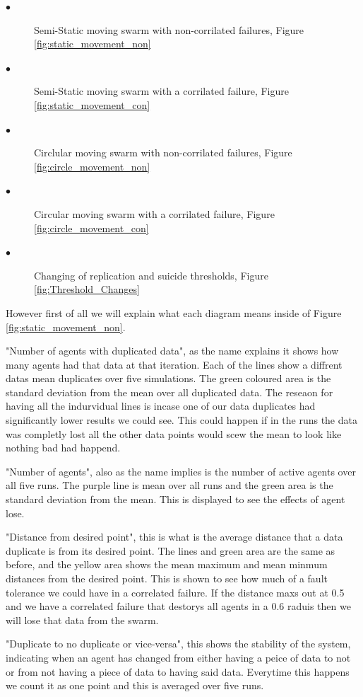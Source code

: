 \documentclass{UoYCSproject}
\begin{document}
\begin{description}
\item[$\bullet$] Semi-Static moving swarm with non-corrilated failures, Figure \ref{fig:static_movement_non}
\item[$\bullet$] Semi-Static moving swarm with a corrilated failure, Figure \ref{fig:static_movement_con}
\item[$\bullet$] Circlular moving swarm with non-corrilated failures, Figure \ref{fig:circle_movement_non}
\item[$\bullet$] Circular moving swarm with a corrilated failure, Figure \ref{fig:circle_movement_con}
\item[$\bullet$] Changing of replication and suicide thresholds, Figure \ref{fig:Threshold_Changes}
\end{description}

However first of all we will explain what each diagram means inside of Figure \ref{fig:static_movement_non}.

"Number of agents with duplicated data", as the name explains it shows how many agents had that data at that iteration.
Each of the lines show a diffrent datas mean duplicates over five simulations.
The green coloured area is the standard deviation from the mean over all duplicated data.
The reseaon for having all the indurvidual lines is incase one of our data duplicates had significantly lower results we could see.
This could happen if in the runs the data was completly lost all the other data points would scew the mean to look like nothing bad had happend.

"Number of agents", also as the name implies is the number of active agents over all five runs.
The purple line is mean over all runs and the green area is the standard deviation from the mean.
This is displayed to see the effects of agent lose.

"Distance from desired point", this is what is the average distance that a data duplicate is from its desired point.
The lines and green area are the same as before, and the yellow area shows the mean maximum and mean minmum distances from the desired point.
This is shown to see how much of a fault tolerance we could have in a correlated failure.
If the distance maxs out at 0.5 and we have a correlated failure that destorys all agents in a 0.6 raduis then we will lose that data from the swarm.

"Duplicate to no duplicate or vice-versa", this shows the stability of the system, indicating when an agent has changed from either having a peice of data to not or from not having a piece of data to having said data.
Everytime this happens we count it as one point and this is averaged over five runs.
\end{document}
